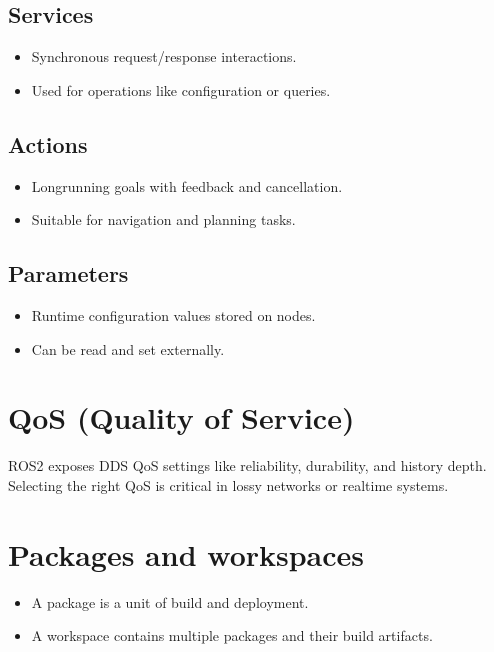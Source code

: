 \documentclass[letterpaper,10pt,english]{sphinxmanual}
\begin{document}
\subsection{Services}
\label{\detokenize{appendix_d_ros2_overview:services}}\begin{itemize}
\item {} 
\sphinxAtStartPar
Synchronous request/response interactions.

\item {} 
\sphinxAtStartPar
Used for operations like configuration or queries.

\end{itemize}


\subsection{Actions}
\label{\detokenize{appendix_d_ros2_overview:actions}}\begin{itemize}
\item {} 
\sphinxAtStartPar
Long\sphinxhyphen{}running goals with feedback and cancellation.

\item {} 
\sphinxAtStartPar
Suitable for navigation and planning tasks.

\end{itemize}


\subsection{Parameters}
\label{\detokenize{appendix_d_ros2_overview:parameters}}\begin{itemize}
\item {} 
\sphinxAtStartPar
Runtime configuration values stored on nodes.

\item {} 
\sphinxAtStartPar
Can be read and set externally.

\end{itemize}


\section{QoS (Quality of Service)}
\label{\detokenize{appendix_d_ros2_overview:qos-quality-of-service}}
\sphinxAtStartPar
ROS2 exposes DDS QoS settings like reliability, durability, and history depth.
Selecting the right QoS is critical in lossy networks or real\sphinxhyphen{}time systems.


\section{Packages and workspaces}
\label{\detokenize{appendix_d_ros2_overview:packages-and-workspaces}}\begin{itemize}
\item {} 
\sphinxAtStartPar
A package is a unit of build and deployment.

\item {} 
\sphinxAtStartPar
A workspace contains multiple packages and their build artifacts.

\end{itemize}
\end{document}

